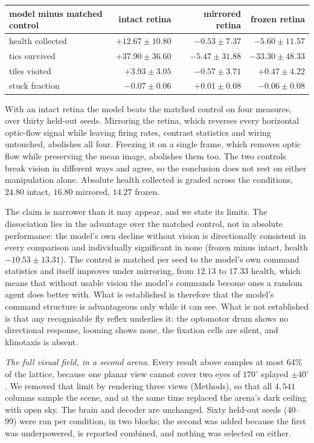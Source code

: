 \documentclass[10pt,twoside]{article}
\begin{document}
\begin{center}
\small
\begin{tabular}{lrrr}
\toprule
model minus matched control & intact retina & mirrored retina & frozen retina\\
\midrule
health collected & $\mathbf{+12.67\pm10.80}$ & $-0.53\pm7.37$ & $-5.60\pm11.57$\\
tics survived    & $\mathbf{+37.90\pm36.60}$ & $-5.47\pm31.88$ & $-33.30\pm48.33$\\
tiles visited    & $\mathbf{+3.93\pm3.05}$   & $-0.57\pm3.71$  & $+0.47\pm4.22$\\
stuck fraction   & $\mathbf{-0.07\pm0.06}$   & $+0.01\pm0.08$  & $-0.06\pm0.08$\\
\bottomrule
\end{tabular}
\end{center}

With an intact retina the model beats the matched control on four measures,
over thirty held-out seeds. Mirroring the retina, which reverses every
horizontal optic-flow signal while leaving firing rates, contrast statistics and
wiring untouched, abolishes all four. Freezing it on a single frame, which
removes optic flow while preserving the mean image, abolishes them too. The two
controls break vision in different ways and agree, so the conclusion does not
rest on either manipulation alone. Absolute health collected is graded across
the conditions, $24.80$ intact, $16.80$ mirrored, $14.27$ frozen.

The claim is narrower than it may appear, and we state its limits. The
dissociation lies in the advantage over the matched control, not in absolute
performance: the model's own decline without vision is directionally consistent
in every comparison and individually significant in none (frozen minus intact,
health $-10.53\pm13.31$). The control is matched per seed to the model's own
command statistics and itself improves under mirroring, from $12.13$ to $17.33$
health, which means that without usable vision the model's commands become
ones a random agent does better with. What is established is therefore that
the model's command structure is advantageous only while it can see. What is not
established is that any recognisable fly reflex underlies it: the optomotor
drum shows no directional response, looming shows none, the fixation cells are
silent, and klinotaxis is absent.

\emph{The full visual field, in a second arena.} Every result above samples at
most 64\% of the lattice, because one planar view cannot cover two eyes of
$170^\circ$ splayed $\pm40^\circ$. We removed that limit by rendering three
views (Methods), so that all $4{,}541$ columns sample the scene, and at the
same time replaced the arena's dark ceiling with open sky. The brain and
decoder are unchanged. Sixty held-out seeds (40--99) were run per condition,
in two blocks; the second was added because the first was underpowered, is
reported combined, and nothing was selected on either.
\end{document}
